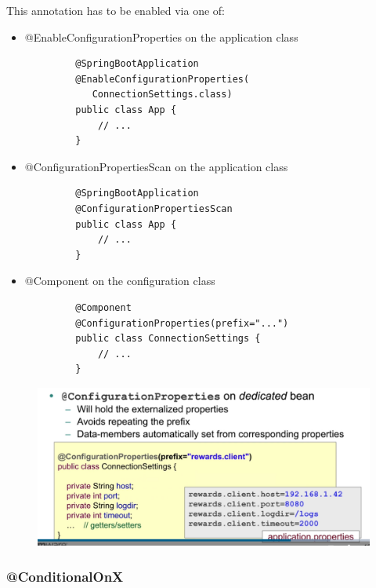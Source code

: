 \documentclass{scrartcl}
\begin{document}
    This annotation has to be enabled via one of:
    \begin{itemize}
        \item @EnableConfigurationProperties on the application class

        \begin{lstlisting}
         @SpringBootApplication
         @EnableConfigurationProperties(
            ConnectionSettings.class)
         public class App {
             // ...
         }
        \end{lstlisting}

        \item @ConfigurationPropertiesScan  on the application class

        \begin{lstlisting}
         @SpringBootApplication
         @ConfigurationPropertiesScan
         public class App {
             // ...
         }
        \end{lstlisting}

        \item @Component on the configuration class

        \begin{lstlisting}
         @Component
         @ConfigurationProperties(prefix="...")
         public class ConnectionSettings {
             // ...
         }
        \end{lstlisting}

    \end{itemize}

\begin{figure}
    \centering
    \includegraphics[width=1\linewidth]{configurationproperties}
    \caption{}
    \label{fig:configurationproperties}
\end{figure}

\subsubsection{@ConditionalOnX}
\end{document}
